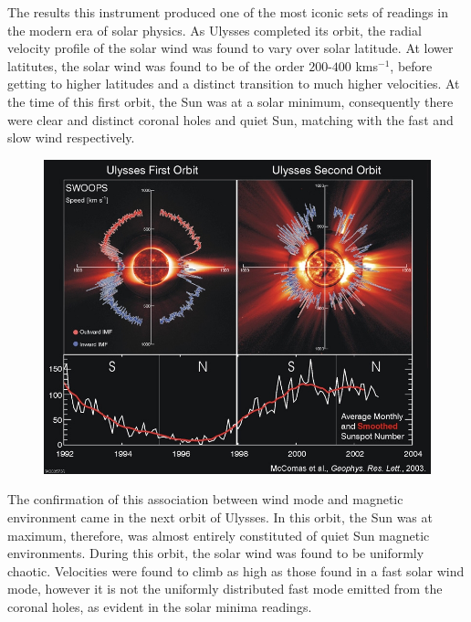 The results this instrument produced one of the most iconic sets of readings in the modern era of solar physics.
As Ulysses completed its orbit, the radial velocity profile of the solar wind was found to vary over solar latitude.
At lower latitutes, the solar wind was found to be of the order $200$-$400$ kms$^{-1}$, before getting to higher latitudes and a distinct transition to much higher velocities.
At the time of this first orbit, the Sun was at a solar minimum, consequently there were clear and distinct coronal holes and quiet Sun, matching with the fast and slow wind respectively.

\begin{figure}
	\includegraphics{Chapter1/Figs/ulysses_solar_wind.png}
	\caption{\cite{McComas2003}}
	\label{fig:ulysses_sw}
\end{figure}

The confirmation of this association between wind mode and magnetic environment came in the next orbit of Ulysses.
In this orbit, the Sun was at maximum, therefore, was almost entirely constituted of quiet Sun magnetic environments.
During this orbit, the solar wind was found to be uniformly chaotic.
Velocities were found to climb as high as those found in a fast solar wind mode, however it is not the uniformly distributed fast mode emitted from the coronal holes, as evident in the solar minima readings.

